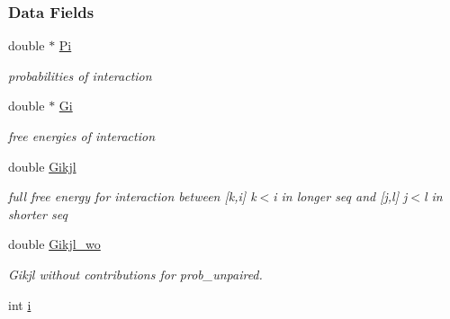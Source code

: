 \subsubsection*{Data Fields}
\begin{DoxyCompactItemize}
\item 
\hypertarget{group__data__structures_a1fc8b3860c083f164daa9712690a3a56}{}double $\ast$ \hyperlink{group__data__structures_a1fc8b3860c083f164daa9712690a3a56}{Pi}\label{group__data__structures_a1fc8b3860c083f164daa9712690a3a56}

\begin{DoxyCompactList}\small\item\em probabilities of interaction \end{DoxyCompactList}\item 
\hypertarget{group__data__structures_a54f8183542fff4c32ab7ace49a16c02c}{}double $\ast$ \hyperlink{group__data__structures_a54f8183542fff4c32ab7ace49a16c02c}{Gi}\label{group__data__structures_a54f8183542fff4c32ab7ace49a16c02c}

\begin{DoxyCompactList}\small\item\em free energies of interaction \end{DoxyCompactList}\item 
\hypertarget{group__data__structures_ad58303190f9e085c3ab59890cbf61223}{}double \hyperlink{group__data__structures_ad58303190f9e085c3ab59890cbf61223}{Gikjl}\label{group__data__structures_ad58303190f9e085c3ab59890cbf61223}

\begin{DoxyCompactList}\small\item\em full free energy for interaction between \mbox{[}k,i\mbox{]} k$<$i in longer seq and \mbox{[}j,l\mbox{]} j$<$l in shorter seq \end{DoxyCompactList}\item 
\hypertarget{group__data__structures_a41793812abae560805414761fec398fe}{}double \hyperlink{group__data__structures_a41793812abae560805414761fec398fe}{Gikjl\+\_\+wo}\label{group__data__structures_a41793812abae560805414761fec398fe}

\begin{DoxyCompactList}\small\item\em Gikjl without contributions for prob\+\_\+unpaired. \end{DoxyCompactList}\item 
\hypertarget{group__data__structures_ab6d031a21388be8763b75ea74c937f17}{}int \hyperlink{group__data__structures_ab6d031a21388be8763b75ea74c937f17}{i}\label{group__data__structures_ab6d031a21388be8763b75ea74c937f17}


\end{DoxyCompactItemize}
